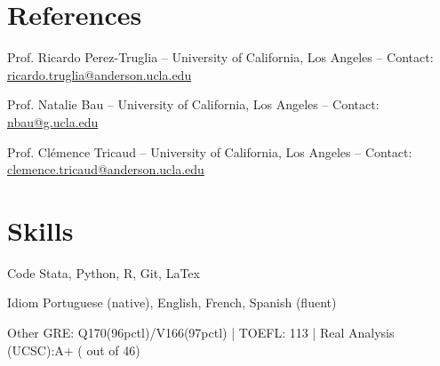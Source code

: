\documentclass[11pt,letterpaper]{report}
\begin{document}
    \section*{References}
          \begin{tablist}
               \item[Prof. Ricardo Perez-Truglia] -- University of California, Los Angeles -- Contact: \href{mailto:ricardo.truglia@anderson.ucla.edu}{ricardo.truglia@anderson.ucla.edu}
               \item[Prof. Natalie Bau] -- University of California, Los Angeles -- Contact: \href{mailto:nbau@g.ucla.edu}{nbau@g.ucla.edu}
               \item[Prof. Cl\'emence Tricaud] -- University of California, Los Angeles -- Contact: \href{mailto:clemence.tricaud@anderson.ucla.edu}{clemence.tricaud@anderson.ucla.edu}
          \end{tablist}


\section*{Skills}

    \begin{tablist}
     \item[Code] \tab{}Stata, Python, R, Git, LaTex
     \item[Idiom]  \tab{}Portuguese (native), English, French, Spanish (fluent)
     \item[Other] \tab GRE: Q170(96pctl)/V166(97pctl) | TOEFL: 113 | Real Analysis (UCSC):A+ ( out of 46)


    \end{tablist}









\end{document}
